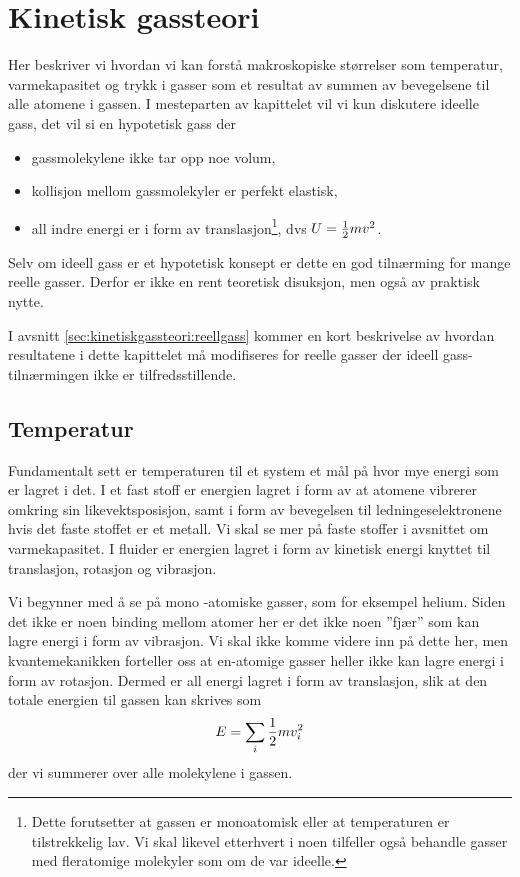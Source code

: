\chapter{Kinetisk gassteori}
Her beskriver vi hvordan vi kan forstå makroskopiske størrelser som temperatur, varmekapasitet og trykk i gasser som et resultat av summen av bevegelsene til alle atomene i gassen. I mesteparten av kapittelet vil vi kun diskutere ideelle gass, det vil si en hypotetisk gass der
\begin{itemize}
	\item
	gassmolekylene ikke tar opp noe volum,
	\item
	kollisjon mellom gassmolekyler er perfekt elastisk,
	\item
	all indre energi er i form av translasjon\footnote{Dette forutsetter at gassen er  monoatomisk eller at temperaturen er tilstrekkelig lav. Vi skal likevel etterhvert i noen tilfeller også behandle gasser med fleratomige molekyler som om de var ideelle.}, dvs $U = \frac{1}{2} mv^2$.
\end{itemize}
Selv om ideell gass er et hypotetisk konsept er dette en god tilnærming for mange reelle gasser. Derfor er ikke en rent teoretisk disuksjon, men også av praktisk nytte.

I avsnitt \ref{sec:kinetiskgassteori:reellgass} kommer en kort beskrivelse av hvordan resultatene i dette kapittelet må modifiseres for reelle gasser der ideell gass-tilnærmingen ikke er tilfredsstillende.

\section{Temperatur}
\label{sec:kinetiskgassteori:temperatur}
Fundamentalt sett er temperaturen til et system et mål på hvor mye energi som er lagret i det. I et fast stoff er energien lagret i form av at atomene vibrerer omkring sin likevektsposisjon, samt i form av bevegelsen til ledningeselektronene hvis det faste stoffet er et metall. Vi skal se mer på faste stoffer i avsnittet om varmekapasitet. I fluider er energien lagret i form av kinetisk energi knyttet til translasjon, rotasjon og vibrasjon. 

Vi begynner med å se på mono	-atomiske gasser, som for eksempel helium. Siden det ikke er noen binding mellom atomer her er det ikke noen 
''fjær'' som kan lagre energi i form av vibrasjon. Vi skal ikke komme videre inn på dette her, men kvantemekanikken forteller oss at en-atomige gasser heller ikke kan lagre energi i form av rotasjon. Dermed er all energi lagret i form av translasjon, slik at den totale energien til gassen kan skrives som
\begin{displaymath}
	E = \sum_i \frac{1}{2} mv_i^2
\end{displaymath}
der vi summerer over alle molekylene i gassen.

